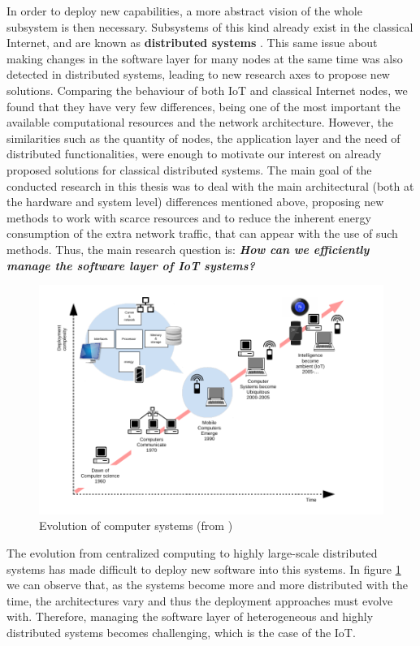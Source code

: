 In order to deploy new capabilities, a more abstract vision of the whole subsystem is then necessary.
Subsystems of this kind already exist in the classical Internet, and are known as \textbf{distributed systems} \cite{coulouris2005distributed}.
This same issue about making changes in the software layer for many nodes at the same time was also detected in distributed systems, leading to new research axes to propose new solutions.
Comparing the behaviour of both IoT and classical Internet nodes, we found that they have very few differences, being one of the most important the available computational resources and the network architecture.
However, the similarities such as the quantity of nodes, the application layer and the need of distributed functionalities, were enough to motivate our interest on already proposed solutions for classical distributed systems.
The main goal of the conducted research in this thesis was to deal with the main architectural (both at the hardware and system level) differences mentioned above, proposing new methods to work with scarce resources and to reduce the inherent energy consumption of the extra network traffic, that can appear with the use of such methods.
Thus, the main research question is: \textit{\textbf{How can we efficiently manage the software layer of IoT systems?}}

\begin{figure}[htb]
	\centering
	\includegraphics[width=1\columnwidth]{chapters/background.images/evolutionCompSys.pdf}
	\caption{Evolution of computer systems (from  \cite{waldner2007nano})}
	\label{fig:EvolCompSyst}
\end{figure}

The evolution from centralized computing to highly large-scale distributed systems has made difficult to deploy new software into this systems.
In figure \ref{fig:EvolCompSyst} we can observe that, as the systems become more and more distributed with the time, the architectures vary and thus the deployment approaches must evolve with.
Therefore, managing the software layer of heterogeneous and highly distributed systems becomes challenging, which is the case of the IoT.

